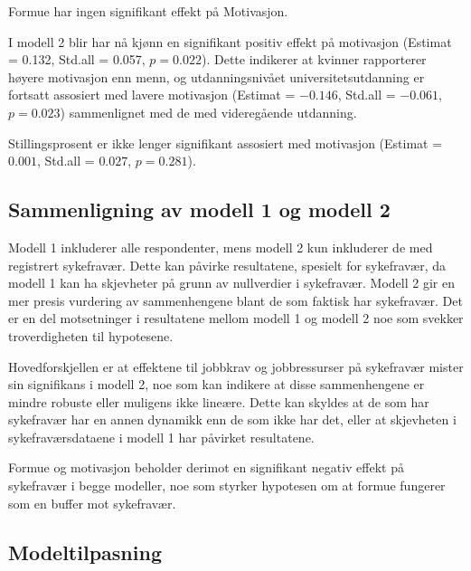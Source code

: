 \documentclass[
  12pt,
  a4paper,
  DIV=11,
  numbers=noendperiod]{scrartcl}
\begin{document}
Formue har ingen signifikant effekt på Motivasjon.

I modell 2 blir har nå kjønn en signifikant positiv effekt på motivasjon
(Estimat = 0.132, Std.all = 0.057, \(p = 0.022\)). Dette indikerer at
kvinner rapporterer høyere motivasjon enn menn, og utdanningsnivået
universitetsutdanning er fortsatt assosiert med lavere motivasjon
(Estimat = \(-0.146\), Std.all = \(-0.061\), \(p = 0.023\)) sammenlignet
med de med videregående utdanning.

Stillingsprosent er ikke lenger signifikant assosiert med motivasjon
(Estimat = \(0.001\), Std.all = \(0.027\), \(p = 0.281\)).

\subsection{Sammenligning av modell 1 og modell
2}\label{sammenligning-av-modell-1-og-modell-2}

Modell 1 inkluderer alle respondenter, mens modell 2 kun inkluderer de
med registrert sykefravær. Dette kan påvirke resultatene, spesielt for
sykefravær, da modell 1 kan ha skjevheter på grunn av nullverdier i
sykefravær. Modell 2 gir en mer presis vurdering av sammenhengene blant
de som faktisk har sykefravær. Det er en del motsetninger i resultatene
mellom modell 1 og modell 2 noe som svekker troverdigheten til
hypotesene.

Hovedforskjellen er at effektene til jobbkrav og jobbressurser på
sykefravær mister sin signifikans i modell 2, noe som kan indikere at
disse sammenhengene er mindre robuste eller muligens ikke lineære. Dette
kan skyldes at de som har sykefravær har en annen dynamikk enn de som
ikke har det, eller at skjevheten i sykefraværsdataene i modell 1 har
påvirket resultatene.

Formue og motivasjon beholder derimot en signifikant negativ effekt på
sykefravær i begge modeller, noe som styrker hypotesen om at formue
fungerer som en buffer mot sykefravær.

\subsection{Modeltilpasning}\label{modeltilpasning}
\end{document}
